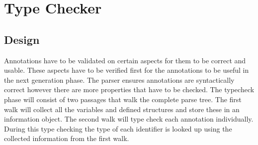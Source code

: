 \documentclass[a4paper]{article}
\begin{document}
\section{Type Checker}
\label{sec:typechecker}
\subsection{Design}
Annotations have to be validated on certain aspects for them to be correct and usable. These aspects have to be verified first for the annotations to be useful in the next generation phase. The parser ensures annotations are syntactically correct however there are more properties that have to be checked. The typecheck phase will consist of two passages that walk the complete parse tree. The first walk will collect all the variables and defined structures and store these in an information object. The second walk will type check each annotation individually. During this type checking the type of each identifier is looked up using the collected information from the first walk. 
\end{document}

